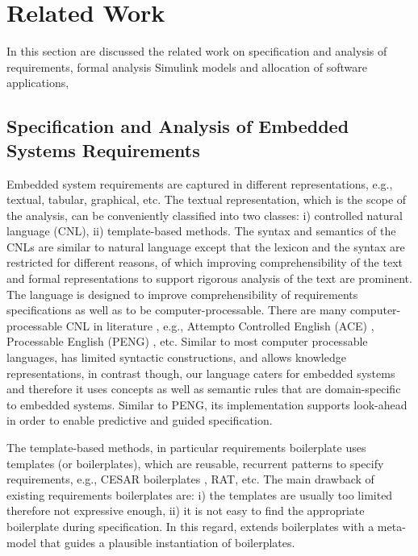 \chapter{Related Work}
In this section are discussed the related work on specification and analysis of requirements, formal analysis Simulink models and allocation of software applications,

\section{Specification and Analysis of Embedded Systems Requirements}
Embedded system requirements are captured in different representations, e.g., textual, tabular, graphical, etc. The textual representation, which is the scope of the analysis, can be conveniently classified into two classes: i) controlled natural language (CNL), ii) template-based methods.  The syntax and semantics of the CNLs are similar to natural language except that the lexicon and the syntax are restricted for different reasons, of which improving comprehensibility of the text and formal representations to support rigorous analysis of the text are prominent. The \resa{} language is designed to improve comprehensibility of requirements specifications as well as to be computer-processable. There are many computer-processable CNL in literature \cite{Kuhn2014ALanguages}, e.g., Attempto Controlled English (ACE) \cite{attempto96}, Processable English (PENG) \cite{Schwitter2002EnglishLanguage}, etc. Similar to most computer processable languages, \resa{} has limited syntactic constructions, and allows knowledge representations, in contrast though, our language caters for embedded systems and therefore it uses concepts as well as semantic rules that are domain-specific to embedded systems. Similar to PENG, its implementation supports look-ahead in order to enable predictive and guided specification.

The template-based methods, in particular requirements boilerplate uses templates (or boilerplates), which are reusable, recurrent patterns to specify requirements, e.g., CESAR boilerplates \cite{Farfeleder2011DODT:Development}, RAT, etc. The main drawback of existing requirements boilerplates are: i) the templates are usually too limited therefore not expressive enough, ii) it is not easy to find the appropriate boilerplate during specification. In this regard, \resa{} extends boilerplates with a meta-model that guides a plausible instantiation of boilerplates.


